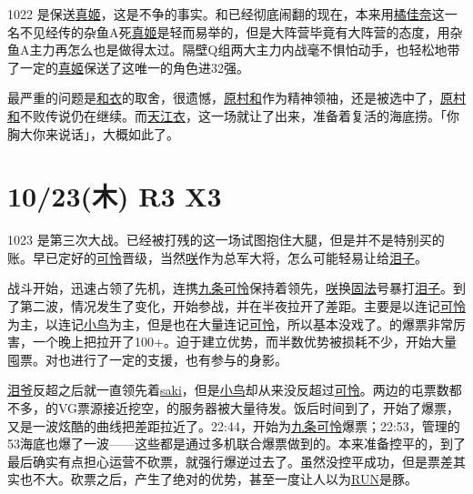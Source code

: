 1022 是保送\uline{真姬}，这是不争的事实。和已经彻底闹翻的现在，本来用\uline{橘佳奈}这一名不见经传的杂鱼A死\uline{真姬}是轻而易举的，但是大阵营毕竟有大阵营的态度，用杂鱼A主力再怎么也是做得太过。隔壁Q组两大主力内战毫不惧怕动手，也轻松地带了一定的\uline{真姬}保送了这唯一的角色进32强。

最严重的问题是\uline{和}\uline{衣}的取舍，很遗憾，\uline{原村和}作为精神领袖，还是被选中了，\uline{原村和}不败传说仍在继续。而\uline{天江衣}，这一场就让了出来，准备着复活的海底捞。「你胸大你来说话」，大概如此了。

\section{10/23(木) R3 X3}


1023 是第三次大战。已经被打残的这一场试图抱住大腿，但是并不是特别买的账。早已定好的\uline{可怜}晋级，当然\uline{咲}作为总军大将，怎么可能轻易让给\uline{泪子}。

战斗开始，迅速占领了先机，连携\uline{九条可怜}保持着领先，\uline{咲}换\uline{固法}号暴打\uline{泪子}。到了第二波，情况发生了变化，开始参战，并在半夜拉开了差距。主要是以连记\uline{可怜}为主，以连记\uline{小鸟}为主，但是也在大量连记\uline{可怜}，所以基本没戏了。的爆票非常厉害，一个晚上把拉开了100+。迫于建立优势，而半数优势被损耗不少，开始大量囤票。对也进行了一定的支援，也有参与的身影。

\uline{泪爷}反超之后就一直领先着\uline{saki}，但是\uline{小鸟}却从来没反超过\uline{可怜}。两边的屯票数都不多，的VG票源接近挖空，的服务器被大量待发。饭后时间到了，开始了爆票，又是一波炫酷的曲线把差距拉近了。22:44，开始为\uline{九条可怜}爆票；22:53，管理的53海底也爆了一波——这些都是通过多机联合爆票做到的。本来准备控平的，到了最后确实有点担心运营不砍票，就强行爆逆过去了。虽然没控平成功，但是票差其实也不大。砍票之后，产生了绝对的优势，甚至一度让人以为\uline{RUN}是豚。

